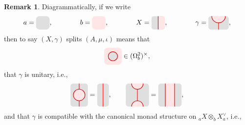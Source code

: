 \documentclass[12pt, reqno]{amsart}
\newcommand{\tikzmath}[2][]
{\vcenter{\hbox{\begin{tikzpicture}[#1]#2\end{tikzpicture}}}
}
\newcommand{\AsColor}{red}
\newcommand{\AColor}{lightgray!50}
\newcommand{\Asplitcolor}{red!10}
\newcommand{\XsColor}{red!80!black}
\theoremstyle{plain}
\theoremstyle{definition}
\newtheorem{rem}[thm]{Remark}
\begin{document}
\begin{rem}
Diagrammatically, if we write
\[
a=\tikzmath{
\tikzset{scale=0.7}
    \coordinate(O) at (0,0); 
    \fill[\AColor,rounded corners=5pt](O)rectangle ++(1,1);
},
\qquad\qquad
b=\tikzmath{
\tikzset{scale=0.7}
    \coordinate(O) at (0,0); 
    \fill[\Asplitcolor,rounded corners=5pt](O)rectangle ++(1,1);
},
\qquad\qquad
X=\tikzmath{
    \tikzset{scale=0.7}
    \coordinate(O) at (0,0); 
    \clip[rounded corners](O)rectangle ++(1,1);
    \fill[\AColor](O)rectangle ++(1,1);                    
    \fill[\Asplitcolor](O)++(0.5,0)rectangle ++(0.5,1);         
    \draw[\XsColor,thick](O)++(0.5,0)--++(0,1);                 
},
\qquad\qquad
\gamma=\tikzmath{
    \tikzset{scale=.7,yscale=-1}
    \coordinate(O) at (0,0); 
    \fill[\AColor,rounded corners](O)++(-0.25,0)rectangle ++(1.5,1);         
    \draw[\AsColor,thick](O)++(0.5,0.5)--++(0,0.5);
    \fill[\Asplitcolor](O)++(1,0) arc(0:180:0.5) --cycle;
    \draw[\XsColor,thick] (O)++(1,0) arc(0:180:0.5);
},
\]
then to say $(X,\gamma)$ splits $(A,\mu,\iota)$ means that
\[
\tikzmath{
\tikzset{scale=0.3}
    \coordinate (O) at (0,0);
    \fill[\Asplitcolor, rounded corners=5pt] (O) rectangle ++(3,3);
    \draw[thick,fill=\AColor, draw=\XsColor] (O)++(1.5,1.5) circle (0.8); 
}
\in
(\Omega^2_b)^\times,
\]
that $\gamma$ is unitary, i.e.,
\[
\tikzmath{
    \tikzset{scale=0.3}
    \coordinate (O) at (0,0);
    \fill[\AColor,rounded corners] (O) rectangle ++(3,4);
    \draw[\AsColor,thick] (O) ++(1.5,0) -- ++(0,1);
    \draw[\AsColor,thick] (O) ++(1.5,3) -- ++(0,1);
    \draw[thick,fill=\Asplitcolor, draw=\XsColor](O)++(1.5,2) circle(1);
}
=
\tikzmath{
\tikzset{scale=0.3}
    \coordinate (O) at (0,0);
    \fill[\AColor,rounded corners] (O) rectangle ++(2,4);
    \draw[\AsColor,thick] (O) ++(1,0) -- ++(0,4);
},
\qquad
\tikzmath{
\tikzset{scale=0.3}
    \coordinate (O) at (0,0);
    \fill[\AColor,rounded corners] (O) rectangle ++(4,4); 
    \fill[\Asplitcolor] (O) ++(1,4) arc(-180:0:1) -- cycle; 
    \fill[\Asplitcolor] (O) ++(1,0) arc(180:0:1) -- cycle; 
    \draw[\AsColor,thick] (O) ++(2,1)--++(0,2);
    \draw[\XsColor,thick] (O) ++(1,4) arc(-180:0:1);
    \draw[\XsColor,thick] (O) ++(1,0) arc(180:0:1);
}
=
\tikzmath{
\tikzset{scale=0.3}
    \coordinate (O) at (0,0);
    \fill[\AColor,rounded corners] (O) rectangle ++(4,4); 
    \fill[\Asplitcolor] (O) ++(1.2,0) rectangle ++(1.6,4); 
    \draw[\XsColor,thick] (O) ++(1.2,0) -- ++(0,4); 
    \draw[\XsColor,thick] (O) ++(2.8,0) -- ++(0,4);
},
\]
and that $\gamma$ is compatible with the canonical monad structure on ${}_aX\otimes_b X^\vee_a$, i.e.,

\end{rem}
\end{document}
